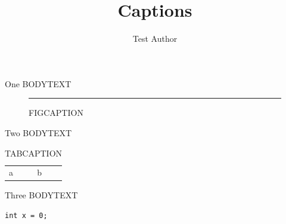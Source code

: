 \documentclass[aspectratio=169,10pt]{beamer}
\title{Captions}
\author{Test Author}
\begin{document}
\begin{frame}{One}
	BODYTEXT
	\begin{figure}
		\rule{2cm}{1cm}
		\caption{FIGCAPTION}
	\end{figure}
\end{frame}
\begin{frame}{Two}
	BODYTEXT
	\begin{table}
		\begin{tabular}{ll} a & b \\ \end{tabular}
		\caption{TABCAPTION}
	\end{table}
\end{frame}
\begin{frame}[fragile]{Three}
	BODYTEXT
	\begin{lstlisting}[caption={LSTCAPTION}]
int x = 0;
	\end{lstlisting}
\end{frame}
\end{document}
